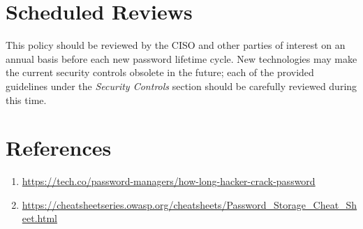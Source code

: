 \documentclass[11pt]{article}
\begin{document}
\section{Scheduled Reviews}
\label{sec:orgdb20c08}
This policy should be reviewed by the CISO and other parties of interest on an annual basis before each new password lifetime cycle. New technologies may make the current security controls obsolete in the future; each of the provided guidelines under the \emph{Security Controls} section should be carefully reviewed during this time.

\section{References}
\label{sec:orgf6bd880}
\begin{enumerate}
\item \url{https://tech.co/password-managers/how-long-hacker-crack-password}
\item \url{https://cheatsheetseries.owasp.org/cheatsheets/Password\_Storage\_Cheat\_Sheet.html}
\end{enumerate}
\end{document}
